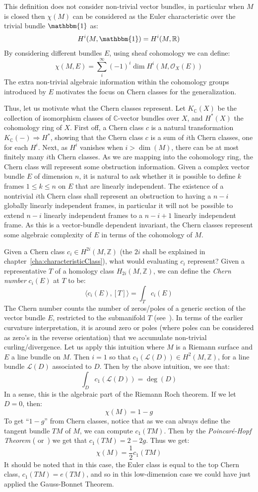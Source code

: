 \documentclass{book}
\newcommand{\R}{{\mathbb{R}}}
\newcommand{\Z}{{\mathbb{Z}}}
\newcommand{\C}{{\mathbb{C}}}
\newcommand{\CL}{{\mathcal{L}}}
\newcommand{\CO}{{\mathcal{O}}}
\renewcommand{\deg}{{\operatorname{deg}}}
\newcommand{\Rw}{\Rightarrow}
\begin{document}
This definition does not consider non-trivial vector bundles, in particular when $M$ is closed then $\chi(M)$
can be considered as the Euler characteristic over the trivial bundle $\mathbbm{1}$ as:
\[
  H^i(M, \mathbbm{1}) = H^i(M, \R)
\]
By considering different bundles $E$, using sheaf cohomology we can define:
\[
  \chi(M, E) = \sum_i^\infty (-1)^i \dim H^i(M, \CO_X(E))
\]
The extra non-trivial algebraic information within the cohomology groups introduced by $E$ motivates the focus on Chern
classes for the generalization.


Thus, let us motivate what the Chern classes represent. Let $K_\C(X)$ be the collection of isomorphism classes
of $\C$-vector bundles over $X$, and $H^*(X)$ the cohomology ring of $X$. First off, a Chern class $c$ is a
natural transformation $K_\C(-) \Rw H^*$, showing that the Chern class $c$ is a sum of $i$th Chern classes,
one for each $H^i$. Next, as $H^i$ vanishes when $i > \dim(M)$, there can be at most finitely many $i$th Chern
classes. As we are mapping into the cohomology ring, the Chern class will represent some obstruction
information. Given a complex vector bundle $E$ of dimension $n$, it is natural to ask whether it is possible to
define $k$ frames $1\le k \le n$ on $E$ that are linearly independent. The existence of a nontrivial $i$th
Chern class shall represent an obstruction to having a $n-i$ globally linearly independent
frames, in particular it will not be possible to extend $n-i$ linearly independent frames to a $n-i+1$
linearly independent frame. As this is a vector-bundle dependent invariant, the Chern classes represent some
algebraic complexity of $E$ in terms of the cohomology of $M$.

Given a Chern class $c_i \in H^{2i}(M, \Z)$ (the $2i$ shall be explained in
chapter~\ref{cha:characteristicClass}), what would evaluating $c_i$ represent? Given a representative $T$ of
a homology class $H_{2i}(M, \Z)$, we can define the \emph{Chern number} $c_i(E)$ at $T$ to be:
\[
  \langle c_i(E), [T] \rangle = \int_T c_i(E)
\]
The Chern number counts the number of zeros/poles of a generic section of the vector bundle $E$, restricted to the
submanifold $T$ (see~\cite{NateKTheory}). In terms of the earlier curvature interpretation, it is around
zero or poles (where poles can be considered as zero's in the reverse orientation) that we accumulate non-trivial
curling/divergence. Let us apply this intuition where $M$ is a Riemann surface and $E$ a line bundle on $M$.
Then $i = 1$ so that $c_1(\CL(D)) \in H^2(M, \Z)$, for a line bundle $\CL(D)$ associated to $D$. Then by the
above intuition, we see that:
\[
  \int_D c_1(\CL(D)) = \deg(D)
\]
In a sense, this is the algebraic part of the Riemann Roch theorem. If we let $D = 0$, then:
\[
  \chi(M) = 1-g
\]
To get ``$1-g$'' from Chern classes, notice that as we can always define the tangent bundle $TM$ of
$M$, we can compute $c_1(TM)$. Then by the \emph{Poincar\'e-Hopf Theorem} (\cite{NateAlgTop}
or~\cite{NateDiffGeo}) we get that $c_1(TM) = 2-2g$. Thus we get:
\[
  \chi(M) = \frac{1}{2}c_1(TM)
\]
It should be noted that in this case, the Euler class is equal to the top Chern class, $c_1(TM) = e(TM)$, and
so in this low-dimension case we could have just applied the Gauss-Bonnet Theorem.
\end{document}
